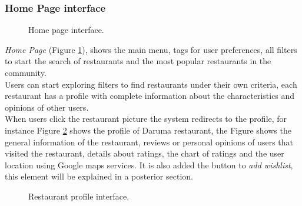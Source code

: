 \subsubsection{Home Page interface}

\begin{figure}
\captionsetup{font=footnotesize}
\centering
{}
\caption{Home page interface.}
\label{fig:home-page}   
\end{figure}
\textit{Home Page} (Figure  \ref{fig:home-page}), shows the main
menu, tags for user preferences, all filters to start the search of
restaurants and the most popular restaurants in the community. \\ 
Users can start exploring filters to find restaurants under their own
criteria, each restaurant has a profile with complete information
about the characteristics and opinions of other users. \\ When users
click the restaurant picture the system redirects to the profile, for
instance Figure  \ref{fig:rest-profile2}  shows the profile of Daruma
restaurant, the Figure  shows the general information of the
restaurant, reviews or personal opinions of users that visited the
restaurant, details about ratings, the chart of ratings and the user
location using Google maps services. It is also added the button to
\textit{add wishlist}, this element will be explained in a posterior
section.
\begin{figure}
\captionsetup{font=footnotesize}
\centering
{}
\caption{Restaurant profile interface.}
\label{fig:rest-profile2}   
\end{figure}

